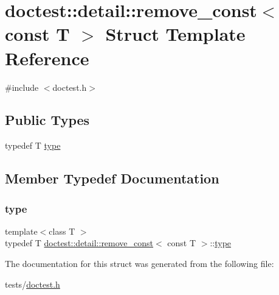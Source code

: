 \hypertarget{structdoctest_1_1detail_1_1remove__const_3_01const_01T_01_4}{}\section{doctest\+:\+:detail\+:\+:remove\+\_\+const$<$ const T $>$ Struct Template Reference}
\label{structdoctest_1_1detail_1_1remove__const_3_01const_01T_01_4}


{\ttfamily \#include $<$doctest.\+h$>$}

\subsection*{Public Types}
\begin{DoxyCompactItemize}
\item 
typedef T \hyperlink{structdoctest_1_1detail_1_1remove__const_3_01const_01T_01_4_ab1e642665bafaad4023fba5295290b17}{type}
\end{DoxyCompactItemize}


\subsection{Member Typedef Documentation}
\mbox{\label{structdoctest_1_1detail_1_1remove__const_3_01const_01T_01_4_ab1e642665bafaad4023fba5295290b17}} 
\subsubsection{\texorpdfstring{type}{type}}
{\footnotesize\ttfamily template$<$class T $>$ \\
typedef T \hyperlink{structdoctest_1_1detail_1_1remove__const}{doctest\+::detail\+::remove\+\_\+const}$<$ const T $>$\+::\hyperlink{structdoctest_1_1detail_1_1remove__const_3_01const_01T_01_4_ab1e642665bafaad4023fba5295290b17}{type}}



The documentation for this struct was generated from the following file\+:\begin{DoxyCompactItemize}
\item 
tests/\hyperlink{doctest_8h}{doctest.\+h}\end{DoxyCompactItemize}
